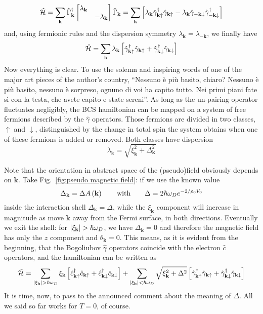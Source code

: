 \[
	\hat{\mathcal{H}} = \sum_\mathbf{k} \hat{\Gamma}_\mathbf{k}^\dagger \begin{bmatrix}
		\lambda_\mathbf{k} & \\
		& -\lambda_\mathbf{k}
	\end{bmatrix} \hat{\Gamma}_\mathbf{k} =
	\sum_\mathbf{k} \left[{\lambda_\mathbf{k} \hat{\gamma}_{\mathbf{k}\uparrow}^\dagger \hat{\gamma}_{\mathbf{k}\uparrow} - \lambda_\mathbf{k} \hat{\gamma}_{-\mathbf{k}\downarrow}\hat{\gamma}_{-\mathbf{k}\downarrow}^\dagger}\right]
\]
and, using fermionic rules and the dispersion symmetry $\lambda_\mathbf{k} = \lambda_{-\mathbf{k}}$, we finally have
\[
	\hat{\mathcal{H}} = \sum_\mathbf{k} \lambda_\mathbf{k} \left[{ \hat{\gamma}_{\mathbf{k}\uparrow}^\dagger \hat{\gamma}_{\mathbf{k}\uparrow} + \hat{\gamma}_{\mathbf{k}\downarrow}^\dagger\hat{\gamma}_{\mathbf{k}\downarrow}}\right]
\]
Now everything is clear. To use the solemn and inspiring words of one of the major art pieces of the author's country, ``Nessuno è più basito, chiaro? Nessuno è più basito, nessuno è sorpreso, ognuno di voi ha capito tutto. Nei primi piani fate sì con la testa, che avete capito e state sereni''. As long as the un-pairing operator fluctuates negligibly, the BCS hamiltonian can be mapped on a system of free fermions described by the $\hat{\gamma}$ operators. Those fermions are divided in two classes, $\uparrow$ and $\downarrow$, distinguished by the change in total spin the system obtains when one of these fermions is added or removed. Both classes have dispersion
\[
	\lambda_\mathbf{k} = \sqrt{\xi_\mathbf{k}^2 + \Delta_\mathbf{k}^2}
\]

Note that the orientation in abstract space of the (pseudo)field obviously depends on $\mathbf{k}$. Take Fig.~\ref{fig:pseudo magnetic field}: if we use the known value
\[
	\Delta_\mathbf{k} = \Delta A\lrR{\mathbf{k}}
	\quad\qq{with}\quad
	\Delta = 2 \hbar\omega_D e^{-2/\rho_0 V_0}
\]
inside the interaction shell $\Delta_\mathbf{k} = \Delta$, while the $\xi_\mathbf{k}$ component will increase in magnitude as move $\mathbf{k}$ away from the Fermi surface, in both directions. Eventually we exit the shell: for $\abs{\xi_\mathbf{k}} > \hbar\omega_D$, we have $\Delta_\mathbf{k} = 0$ and therefore the magnetic field has only the $z$ component and $\theta_\mathbf{k}=0$.  This means, as it is evident from the beginning, that the Bogoliubov $\hat{\gamma}$ operators coincide with the electron $\hat{c}$ operators, and the hamiltonian can be written as
\[
	\hat{\mathcal{H}} = \sum_{\abs{\xi_\mathbf{k}} > \hbar\omega_D} \xi_\mathbf{k} \left[{ \hat{c}_{\mathbf{k}\uparrow}^\dagger \hat{c}_{\mathbf{k}\uparrow} + \hat{c}_{\mathbf{k}\downarrow}^\dagger \hat{c}_{\mathbf{k}\downarrow}}\right] + \sum_{\abs{\xi_\mathbf{k}} < \hbar\omega_D} \sqrt{\xi_\mathbf{k}^2 + \Delta^2} \left[{ \hat{\gamma}_{\mathbf{k}\uparrow}^\dagger \hat{\gamma}_{\mathbf{k}\uparrow} + \hat{\gamma}_{\mathbf{k}\downarrow}^\dagger \hat{\gamma}_{\mathbf{k}\downarrow}}\right]
\]
It is time, now, to pass to the announced comment about the meaning of $\Delta$. All we said so far works for $T=0$, of course.

